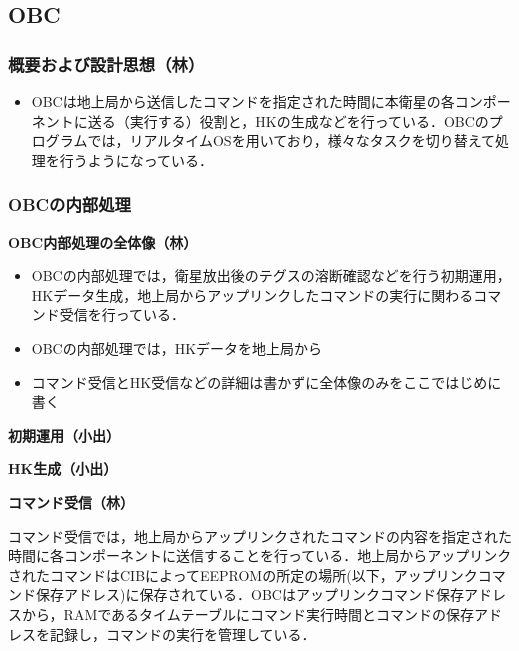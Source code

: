 
\subsection{OBC}
\subsubsection{概要および設計思想（林）}
\begin{itemize}
	\item OBCは地上局から送信したコマンドを指定された時間に本衛星の各コンポーネントに送る（実行する）役割と，HKの生成などを行っている．OBCのプログラムでは，リアルタイムOSを用いており，様々なタスクを切り替えて処理を行うようになっている．
\end{itemize}
\subsubsection{OBCの内部処理}
\textbf{OBC内部処理の全体像（林）}\par
\begin{itemize}
	\item OBCの内部処理では，衛星放出後のテグスの溶断確認などを行う初期運用，HKデータ生成，地上局からアップリンクしたコマンドの実行に関わるコマンド受信を行っている．
	\item OBCの内部処理では，HKデータを地上局から
	\item コマンド受信とHK受信などの詳細は書かずに全体像のみをここではじめに書く
\end{itemize}\par
\textbf{初期運用（小出）}\par
\textbf{HK生成（小出）}\par
\textbf{コマンド受信（林）}\par
コマンド受信では，地上局からアップリンクされたコマンドの内容を指定された時間に各コンポーネントに送信することを行っている．地上局からアップリンクされたコマンドはCIBによってEEPROMの所定の場所(以下，アップリンクコマンド保存アドレス)に保存されている．OBCはアップリンクコマンド保存アドレスから，RAMであるタイムテーブルにコマンド実行時間とコマンドの保存アドレスを記録し，コマンドの実行を管理している．
